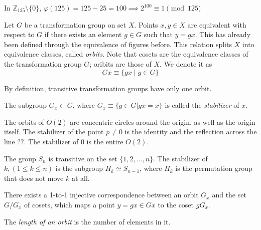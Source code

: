 \documentclass{article}
\begin{document}
  \begin{example}
    In $\mathbb{Z}_{125} \setminus \{0\}$, $\varphi(125) = 125 - 25 = 100 \implies 2^{100} \equiv 1 \pmod{125}$
  \end{example}

  \begin{definition}
    Let $G$ be a transformation group on set $X$. Points $x, y \in X$ are equivalent with respect to $G$ if there exists an element $g \in G$ such that $y = g x$. This has already been defined through the equivalence of figures before. This relation splits $X$ into equivalence classes, called \textit{orbits}. Note that cosets are the equivalence classes of the transformation group $G$; oribits are those of $X$. We denote it as
    \[ Gx \equiv \{ g x \;|\;g \in G \} \]
  \end{definition}

  By definition, transitive transformation groups have only one orbit.

  \begin{definition}
    The subgroup $G_{x} \subset G$, where $G_{x} \equiv \{ g \in G | g x = x\}$ is called the \textit{stabilizer} of $x$.
  \end{definition}

  \begin{example}
    The orbits of $O(2)$ are concentric circles around the origin, as well as the origin itself. The stabilizer of the point $p \neq 0$ is the identity and the reflection across the line $??$. The stabilizer of $0$ is the entire $O(2)$.
  \end{example}

  \begin{example}
    The group $S_n$ is transitive on the set $\{1, 2, ..., n\}$. The stabilizer of $k, (1 \leq k \leq n)$ is the subgroup $H_{k} \simeq S_{n-1}$, where $H_k$ is the permutation group that does not move $k$ at all. 
  \end{example}

  \begin{theorem}
    There exists a 1-to-1 injective correspondence between an orbit $G_x$ and the set $G / G_{x}$ of cosets, which maps a point $y = g x \in G x $ to the coset $g G_x$. 
  \end{theorem}

  \begin{definition}
    The \textit{length of an orbit} is the number of elements in it. 
  \end{definition}
\end{document}
